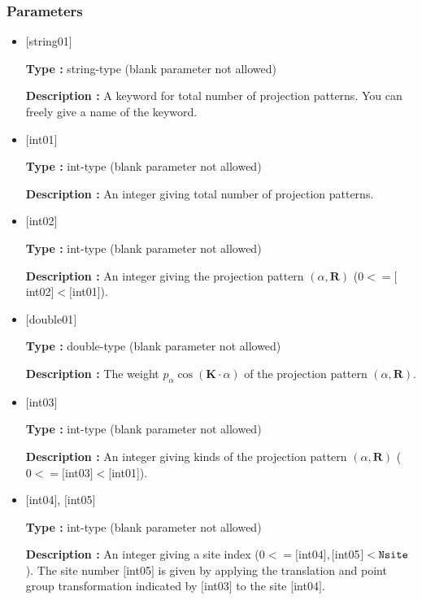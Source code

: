 \subsubsection{Parameters}
 \begin{itemize}

   \item  $[$string01$]$
   
    {\bf Type :} string-type (blank parameter not allowed)

   {\bf Description :} A keyword for total number of projection patterns. You can freely give a name of the keyword.

   \item  $[$int01$]$
   
    {\bf Type :} int-type (blank parameter not allowed)

   {\bf Description :} An integer giving total number of projection patterns. 

  \item  $[$int02$]$
   
 {\bf Type :} int-type (blank parameter not allowed)

{\bf Description :} An integer giving the projection pattern $(\alpha, {\bm R})$ ($0<= [$int02$]<[$int01]). 
 
  \item  $[$double01$]$
   
 {\bf Type :} double-type (blank parameter not allowed)

{\bf Description :} The weight $p_{\alpha}\cos ({\bm K}\cdot \alpha)$ of the projection pattern $(\alpha, {\bm R})$.
 
 \item  $[$int03$]$
   
   {\bf Type :} int-type (blank parameter not allowed)

  {\bf Description :} An integer giving kinds of the projection pattern $(\alpha, {\bm R})$  ($0<= [$int03$]<[$int01]). 

 \item  $[$int04$]$, $[$int05$]$
   
   {\bf Type :} int-type (blank parameter not allowed)

  {\bf Description :} An integer giving a site index ($0<= [$int04$], [$int05$]<\verb|Nsite|$). 
  The site number $[$int05$]$ is given by applying the translation and point group transformation indicated by $[$int03$]$ to the site $[$int04$]$.

\end{itemize}

